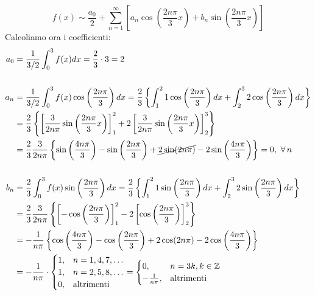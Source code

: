 \begin{figure}[htpb]
\end{figure}
\FloatBarrier

\begin{equation*}
f(x) \sim \frac{a_{0}}{2} + \sum\limits ^{\infty }_{n = 1}\left[ a_{n}\cos\left(\frac{2n\pi }{3} x\right) + b_{n}\sin\left(\frac{2n\pi }{3} x\right)\right]
\end{equation*}
Calcoliamo ora i coefficienti:
\begin{align*}
a_{0} & = \frac{1}{3/2}\int ^{3}_{0} f(x)dx = \frac{2}{3} \cdot 3 = 2\\
 & \\
a_{n} & = \frac{1}{3/2}\int ^{3}_{0} f(x)\cos\left(\frac{2n\pi }{3}\right) dx = \frac{2}{3}\left\{\int ^{2}_{1} 1\cos\left(\frac{2n\pi }{3}\right) dx + \int ^{3}_{2} 2\cos\left(\frac{2n\pi }{3}\right) dx\right\}\\
 & = \frac{2}{3}\left\{\left[\frac{3}{2n\pi }\sin\left(\frac{2n\pi }{3} x\right)\right]^{2}_{1} + 2\left[\frac{3}{2n\pi }\sin\left(\frac{2n\pi }{3} x\right)\right]^{3}_{2}\right\}\\
 & = \frac{2}{3}\frac{3}{2n\pi }\left\{\sin\left(\frac{4n\pi }{3}\right) - \sin\left(\frac{2n\pi }{3}\right) + \cancel{2\sin(2n\pi)} - 2\sin\left(\frac{4n\pi }{3}\right)\right\} = 0,\ \forall n\\
 & \\
b_{n} & = \frac{2}{3}\int ^{3}_{0} f(x)\sin\left(\frac{2n\pi }{3}\right) dx = \frac{2}{3}\left\{\int ^{2}_{1} 1\sin\left(\frac{2n\pi }{3}\right) dx + \int ^{3}_{2} 2\sin\left(\frac{2n\pi }{3}\right) dx\right\}\\
 & = \frac{2}{3}\frac{3}{2n\pi }\left\{\left[ - \cos\left(\frac{2n\pi }{3}\right)\right]^{2}_{1} - 2\left[\cos\left(\frac{2n\pi }{3}\right)\right]^{3}_{2}\right\}\\
 & = - \frac{1}{n\pi }\left\{\cos\left(\frac{4n\pi }{3}\right) - \cos\left(\frac{2n\pi }{3}\right) + 2\cos(2n\pi) - 2\cos\left(\frac{4n\pi }{3}\right)\right\}\\
 & = - \frac{1}{n\pi } \cdot 
 \begin{cases}
1, & n = 1,4,7,\dotsc \\
1, & n = 2,5,8,\dotsc \\
0, & \text{altrimenti}
\end{cases} = 
\begin{cases}
0, & n = 3k,k\in \ZZ \\
- \frac{1}{n\pi } , & \text{altrimenti}
\end{cases}
\end{align*}
